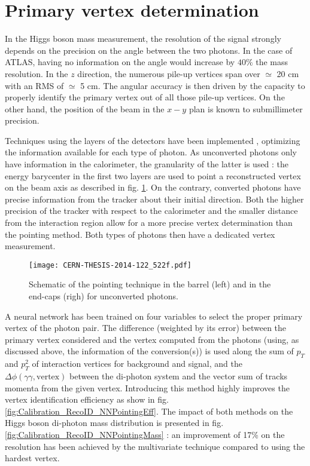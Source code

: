 \section{Primary vertex determination}
\label{sec:orgbd5d583}
In the Higgs boson mass measurement, the resolution of the signal strongly depends on the precision on the angle between the two photons.
In the case of ATLAS, having no information on the angle would increase by \(40\%\) the mass resolution.
In the $z$ direction, the numerous pile-up vertices span over $\simeq$ 20 cm with an RMS of $\simeq$ 5 cm.
The angular accuracy is then driven by the capacity to properly identify the primary vertex out of all those pile-up vertices.
On the other hand, the position of the beam in the \(x-y\) plan is known to submillimeter precision.

Techniques using the layers of the detectors have been implemented \cite{ATL-PHYS-INT-2010-013,CERN-THESIS-2008-047}, optimizing the information available for each type of photon.
As unconverted photons only have information in the calorimeter, the granularity of the latter is used : the energy barycenter in the first two layers are used to point a reconstructed vertex on the beam axis as described in fig. \ref{fig:Calibration_RecoID_pointing}.
On the contrary, converted photons have precise information from the tracker about their initial direction.
Both the higher precision of the tracker with respect to the calorimeter and the smaller distance from the interaction region allow for a more precise vertex determination than the pointing method.
Both types of photons then have a dedicated vertex measurement.

\begin{figure}
  \centering
  \texttt{[image: CERN-THESIS-2014-122\_522f.pdf]}
  \caption{Schematic of the pointing technique in the barrel (left) and in the end-caps (righ) for unconverted photons.\cite{CERN-THESIS-2014-122}}\label{fig:Calibration_RecoID_pointing}
\end{figure}


A neural network \cite{ATL-COM-PHYS-2015-1321} has been trained on four variables to select the proper primary vertex of the photon pair.
The difference (weighted by its error)  between the primary vertex considered and the vertex computed from the photons (using, as discussed above, the information of the conversion(s)) is used along the sum of \(p_T\) and \(p_T^2\) of interaction vertices for background and signal, and the $\Delta\phi(\gamma\gamma,\text{vertex})$ between the di-photon system and the vector sum of tracks momenta from the given vertex.
Introducing this method highly improves the vertex identification efficiency as show in fig. \ref{fig:Calibration_RecoID_NNPointingEff}.
The impact of both methods on the Higgs boson di-photon mass distribution is presented in fig. \ref{fig:Calibration_RecoID_NNPointingMass} : an improvement of 17\% on the resolution has been achieved by the multivariate technique compared to using the hardest vertex.

